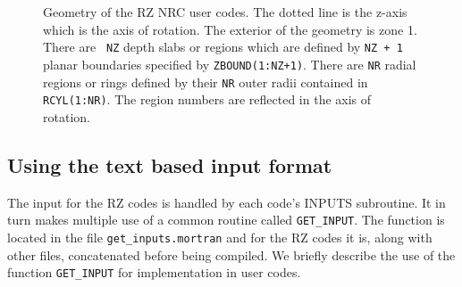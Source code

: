 \documentclass[12pt,twoside]{article}  %
\begin{document}
\begin{figure}[htb]
\begin{center}
\begin{verbatim}
\end{verbatim}
\caption[Schematic of the RZ geometry and notation.]{Geometry of the
RZ NRC user codes.  The dotted line is the z-axis which is the axis
of rotation.  The exterior of the geometry is zone 1.  There are {\tt
NZ} depth slabs or regions which are defined by {\tt NZ + 1} planar boundaries
specified by  {\tt ZBOUND(1:NZ+1)}. There are {\tt NR} radial regions or
rings
defined by their {\tt NR} outer radii contained in {\tt RCYL(1:NR)}. The region
numbers are reflected in the axis of rotation.
\label{fig_geom}
\vspace{3mm} }
\end{center}
\end{figure}


\newpage
\subsection{Using the text based input format}
\label{UNIF}

The input for the RZ codes is handled by each code's
INPUTS subroutine. It in turn makes multiple use of a common routine called
\verb+GET_INPUT+. 
The function is located in the file \verb+get_inputs.mortran+
and for the RZ codes it is, along with other files, concatenated before 
being compiled.
We briefly describe the use of the function \verb+GET_INPUT+
for implementation in user codes.
\end{document}
